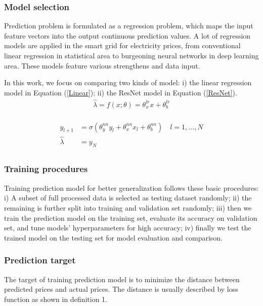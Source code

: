 \documentclass[journal]{IEEEtran}
\begin{document}
\subsubsection{Model selection}
Prediction problem is formulated as a regression problem, which maps the input feature vectors into the output continuous prediction values. A lot of regression models are applied in the smart grid for electricity prices, from conventional linear regression in statistical area to burgeoning neural networks in deep learning area. These models feature various strengthens and data input. 

In this work, we focus on comparing two kinds of model: i) the linear regression model in Equation (\ref{Linear}); ii) the ResNet model in Equation (\ref{ResNet}). 
\begin{equation}
  \label{Linear}
  \begin{aligned}
    \hat{\lambda} = f(x; \theta) = \theta_x^{lr} x + \theta_b^{lr} \\ 
  \end{aligned}
\end{equation}

\begin{equation}
  \label{ResNet}
  \begin{aligned}
     y_{l+1} &= \sigma (\theta_y^{nn} y_l + \theta_x^{nn} x_l + \theta_b^{nn}) \quad l = 1, ..., N \\
     \hat{\lambda} &= y_{N} \\
  \end{aligned}
\end{equation}

\subsubsection{Training procedures}
Training prediction model for better generalization follows these basic procedures: i) A subset of full processed data is selected as testing dataset randomly; ii) the remaining is further split into training and validation set randomly; iii) then we train the prediction model on the training set, evaluate its accuracy on validation set, and tune models' hyperparameters for high accuracy; iv) finally we test the trained model on the testing set for model evaluation and comparison. 

\subsubsection{Prediction target}
The target of training prediction model is to minimize the distance between predicted prices and actual prices. The distance is usually described by loss function as shown in definition 1.
\end{document}
